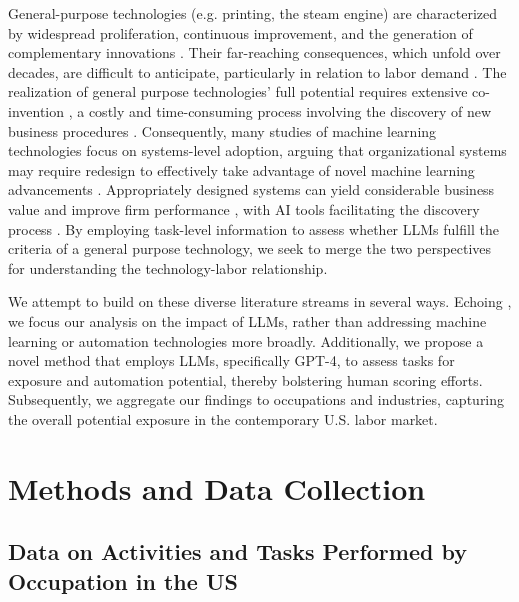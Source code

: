 \documentclass[11pt]{article}
\begin{document}
General-purpose technologies (e.g. printing, the steam engine) are characterized by widespread proliferation, continuous improvement, and the generation of complementary innovations \citep{bresnahan1995general, lipsey2005economic}. Their far-reaching consequences, which unfold over decades, are difficult to anticipate, particularly in relation to labor demand \citep{bessen2018artificial, korinek2018artificial, acemoglu2020ai, benzell2021}. The realization of general purpose technologies' full potential requires extensive co-invention \citep{bresnahan1995general, bresnahan1996technical, bresnahan2002information,lipsey2005economic, dixon2021robot}, a costly and time-consuming process involving the discovery of new business procedures \citep{david1990dynamo,bresnahan1999computerisation, frey2019technology,brynjolfsson2021productivity,feigenbaum2021organizational}. Consequently, many studies of machine learning technologies focus on systems-level adoption, arguing that organizational systems may require redesign to effectively take advantage of novel machine learning advancements \citep{bresnahan2019artificial, agrawal2021ai, goldfarb2023could}. Appropriately designed systems can yield considerable business value and improve firm performance \citep{rock2019engineering, babina2021artificial, zolas2021advanced}, with AI tools facilitating the discovery process \citep{cockburn2018impact, cheng2022innovae}. By employing task-level information to assess whether LLMs fulfill the criteria of a general purpose technology, we seek to merge the two perspectives for understanding the technology-labor relationship.

We attempt to build on these diverse literature streams in several ways. Echoing \citep{felten2023will}, we focus our analysis on the impact of LLMs, rather than addressing machine learning or automation technologies more broadly. Additionally, we propose a novel method that employs LLMs, specifically GPT-4, to assess tasks for exposure and automation potential, thereby bolstering human scoring efforts. Subsequently, we aggregate our findings to occupations and industries, capturing the overall potential exposure in the contemporary U.S. labor market.

\section{Methods and Data Collection}
\label{sec:data}

\subsection{Data on Activities and Tasks Performed by Occupation in the US}
\label{subsec:task_data}
\end{document}
